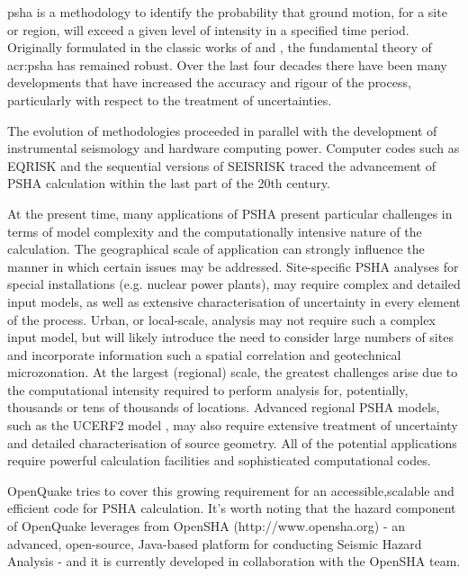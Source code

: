 \Gls{psha} is a methodology to identify the probability that ground motion,
for a site or region, will exceed a given level of intensity in a specified 
time period. Originally formulated in the classic works of \citet{cornell1968} 
and \citet{esteva1968}, the fundamental theory of \gls{acr:psha} has remained 
robust. 
Over the last four decades there have been many developments that have 
increased 
the accuracy and rigour of the process, particularly with respect to the 
treatment of uncertainties.  
%

%
The evolution of methodologies proceeded in parallel with the development 
of instrumental seismology and hardware computing power. Computer codes 
such as EQRISK \citep{mcguire1976} and the sequential versions of SEISRISK
\citep{bender1982,bender1987} traced the advancement of PSHA calculation 
within the last part of the 20th century.

At the present time, many applications of PSHA present particular challenges 
in terms of model complexity and the computationally intensive nature of the 
calculation. The geographical scale of application can strongly influence the 
manner in which certain issues may be addressed. Site-specific PSHA analyses 
for special installations (e.g. nuclear power plants), may require complex and
 detailed input models, as well as extensive characterisation of uncertainty 
in every element of the process. Urban, or local-scale, analysis may not require
 such a complex input model, but will likely introduce the need to consider large
 numbers of sites and incorporate information such a spatial correlation and 
geotechnical microzonation. At the largest (regional) scale, the greatest 
challenges arise due to the computational intensity required to perform analysis 
for, potentially, thousands or tens of thousands of locations. Advanced regional 
PSHA models, such as the UCERF2 model \citep{field2009}, may also require extensive
 treatment of uncertainty and detailed characterisation of source geometry. 
All of the potential applications require powerful calculation facilities and 
sophisticated computational codes.

OpenQuake tries to cover this growing requirement for an accessible,scalable and 
efficient code for PSHA calculation. It's worth noting that the hazard 
component of OpenQuake leverages from OpenSHA (http://www.opensha.org) - 
an advanced, open-source, Java-based platform for conducting Seismic 
Hazard Analysis - and it is currently developed in collaboration with 
the OpenSHA team.  
%
